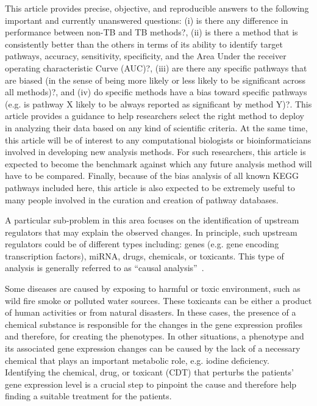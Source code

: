 This article provides precise, objective, and reproducible answers to the following important and currently unanswered questions: (i) is there any difference in performance between non-TB and TB methods?, (ii) is there a method that is consistently better than the others in terms of its ability to identify target pathways, accuracy, sensitivity, specificity, and the Area Under the receiver operating characteristic Curve (AUC)?, (iii) are there any specific pathways that are biased (in the sense of being more likely or less likely to be significant across all methods)?, and (iv) do specific methods have a bias toward specific pathways (e.g. is pathway X likely to be always reported as significant by method Y)?. 
This article provides a guidance to help researchers select the right method to deploy in analyzing their data based on any kind of scientific criteria. 
At the same time, this article will be of interest to any computational biologists or bioinformaticians involved in developing new analysis methods. 
For such researchers, this article is expected to become the benchmark against which any future analysis method will have to be compared. 
Finally, because of the bias analysis of all known KEGG pathways included here, this article is also expected to be extremely useful to many people involved in the curation and creation of pathway databases.

A particular sub-problem in this area focuses on the identification of upstream regulators that may explain the observed changes. In principle, such upstream regulators could be of different types including: genes (e.g. gene encoding transcription factors), miRNA, drugs, chemicals, or toxicants. This type of analysis is generally referred to as ``causal analysis''~\cite{schadt:2005, chindelevitch2012causal, kramer2013causal, felciano2013predictive}. 


Some diseases are caused by exposing to harmful or toxic environment, such as wild fire smoke or polluted water sources. These toxicants can be either a product of human activities or from natural disasters. In these cases, the presence of a chemical substance  is responsible for the changes in  the gene expression profiles and  therefore, for creating the phenotypes. 
In other situations,  a phenotype and its associated  gene expression changes  can be caused by the lack of a necessary chemical  that plays an important metabolic role, e.g. iodine deficiency. 
Identifying the chemical, drug, or toxicant (CDT) that perturbs the patients' gene expression level is a crucial step to pinpoint the cause and therefore help finding a suitable treatment for the patients.


